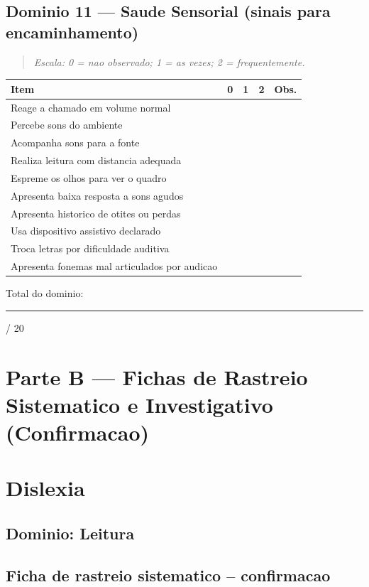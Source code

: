 \documentclass[a4paper,11pt]{book}
\begin{document}
\section{Dominio 11 --- Saude Sensorial (sinais para encaminhamento)}
\begin{quote}\itshape Escala: 0 = nao observado; 1 = as vezes; 2 = frequentemente.\end{quote}
\begin{tabular}{@{}p{10.5cm}ccc p{0.5cm}@{}}\toprule
Item & 0 & 1 & 2 & Obs. \\\midrule
Reage a chamado em volume normal & & & & \\
Percebe sons do ambiente & & & & \\
Acompanha sons para a fonte & & & & \\
Realiza leitura com distancia adequada & & & & \\
Espreme os olhos para ver o quadro & & & & \\
Apresenta baixa resposta a sons agudos & & & & \\
Apresenta historico de otites ou perdas & & & & \\
Usa dispositivo assistivo declarado & & & & \\
Troca letras por dificuldade auditiva & & & & \\
Apresenta fonemas mal articulados por audicao & & & & \\
\bottomrule\end{tabular}
\vspace{0.2cm}\noindent\small Total do dominio: \rule{1cm}{0.3pt} / 20\par\medskip


\clearpage

\chapter*{Parte B --- Fichas de Rastreio Sistematico e Investigativo (Confirmacao)}

\chapter{Dislexia}
\section*{Dominio: Leitura}
\section*{Ficha de rastreio sistematico -- confirmacao}
\end{document}
